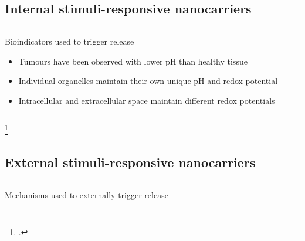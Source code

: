 \documentclass[aspectratio=169,compress]{beamer}
\newcommand*{\autotitle}{\subsecname\hfill\textbf{\small\secname}}
\begin{document}
\subsection{Internal stimuli-responsive nanocarriers}
\begin{frame}{\autotitle}
  \begin{columns}
      \begin{block}{Bioindicators used to trigger release}
        \begin{itemize}
          \item Tumours have been observed with lower \alert{pH} than healthy tissue~
          \item Individual organelles maintain their own unique pH and \alert{redox potential}
          \item Intracellular and extracellular space maintain different redox potentials~\textbf{}
        \end{itemize}
      \end{block}

  \end{columns}
  \footcitetext{gerweck1996cellular,tannock1989acid,saito2003drug}
\end{frame}

\subsection{External stimuli-responsive nanocarriers}
\begin{frame}{\autotitle}
  \begin{columns}
      \begin{block}{Mechanisms used to externally trigger release}
      \end{block}
  \end{columns}
\end{frame}
\end{document}
